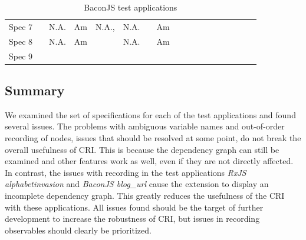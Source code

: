 \begin{table}[]
{\begin{tabular}{llllllllllllllllll}
		Spec 7 & \myes         & N.A.       & Am       & N.A.,\myes & N.A.       & \myes                                 & Am                   & \myes                 & \myes               & \myes               & \myes            & \myes         & \myes                   & \myes                & \myes                 & \myes       & \myes \\
		Spec 8 & \myes         & N.A.       & Am       & \myes      & N.A.       & \mno                                 & Am                   & \myes                 & \myes               & \myes               & \myes            & \mno         & \myes                   & \myes                & \myes                 & \myes       & \myes \\
		Spec 9 & \myes         & \myes         & \myes        & \myes      & \myes         & \myes                                 & \myes                    & \myes                 & \myes               & \myes               & \myes            & \myes         & \myes                   & \myes                & \myes                 & \myes       & \myes
	\end{tabular}%
}
\caption{BaconJS test applications}
\label{tab:BaconJS}
\end{table}

\subsection{Summary}
We examined the set of specifications for each of the test applications and found several issues. The problems with ambiguous variable names and out-of-order recording of nodes, issues that should be resolved at some point, do not break the overall usefulness of CRI. This is because the dependency graph can still be examined and other features work as well, even if they are not directly affected. In contrast, the issues with recording in the test applications \emph{RxJS alphabetinvasion} and \emph{BaconJS blog\_url} cause the extension to display an incomplete dependency graph. This greatly reduces the usefulness of the CRI with these applications.
All issues found should be the target of further development to increase the robustness of CRI, but issues in recording observables should clearly be prioritized.